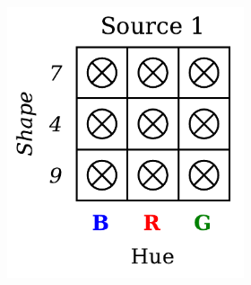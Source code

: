 \begin{dataset}
\begin{figure}[H]
        \begin{subfigure}[b]{0.45\textwidth}
            \centering
            \begin{subfigure}[b]{0.48\textwidth}
                \centering
                \includegraphics[width=\textwidth]{img/datasets/ZSO_fact=hue_env=0.pdf}
            \end{subfigure}
            \begin{subfigure}[b]{0.48\textwidth}
                \centering

\end{subfigure}
\end{subfigure}
\end{figure}
\end{dataset}
